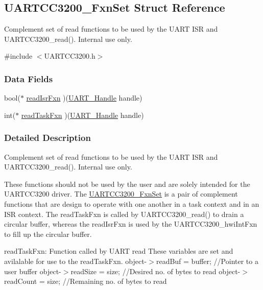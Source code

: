 \subsection{U\+A\+R\+T\+C\+C3200\+\_\+\+Fxn\+Set Struct Reference}
\label{struct_u_a_r_t_c_c3200___fxn_set}


Complement set of read functions to be used by the U\+A\+R\+T I\+S\+R and U\+A\+R\+T\+C\+C3200\+\_\+read(). Internal use only.  




{\ttfamily \#include $<$U\+A\+R\+T\+C\+C3200.\+h$>$}

\subsubsection*{Data Fields}
\begin{DoxyCompactItemize}
\item 
bool($\ast$ \hyperlink{struct_u_a_r_t_c_c3200___fxn_set_a0d200081d3162b633713932b690715ec}{read\+Isr\+Fxn} )(\hyperlink{_u_a_r_t_8h_a13cc669fae768d8212e6491ce71b28af}{U\+A\+R\+T\+\_\+\+Handle} handle)
\item 
int($\ast$ \hyperlink{struct_u_a_r_t_c_c3200___fxn_set_a3d26844b797b84de34663d7c70f1a2fa}{read\+Task\+Fxn} )(\hyperlink{_u_a_r_t_8h_a13cc669fae768d8212e6491ce71b28af}{U\+A\+R\+T\+\_\+\+Handle} handle)
\end{DoxyCompactItemize}


\subsubsection{Detailed Description}
Complement set of read functions to be used by the U\+A\+R\+T I\+S\+R and U\+A\+R\+T\+C\+C3200\+\_\+read(). Internal use only. 

These functions should not be used by the user and are solely intended for the U\+A\+R\+T\+C\+C3200 driver. The \hyperlink{struct_u_a_r_t_c_c3200___fxn_set}{U\+A\+R\+T\+C\+C3200\+\_\+\+Fxn\+Set} is a pair of complement functions that are design to operate with one another in a task context and in an I\+S\+R context. The read\+Task\+Fxn is called by U\+A\+R\+T\+C\+C3200\+\_\+read() to drain a circular buffer, whereas the read\+Isr\+Fxn is used by the U\+A\+R\+T\+C\+C3200\+\_\+hwi\+Int\+Fxn to fill up the circular buffer.

read\+Task\+Fxn\+: Function called by U\+A\+R\+T read These variables are set and avilalable for use to the read\+Task\+Fxn. object-\/$>$read\+Buf = buffer; //\+Pointer to a user buffer object-\/$>$read\+Size = size; //\+Desired no. of bytes to read object-\/$>$read\+Count = size; //\+Remaining no. of bytes to read

